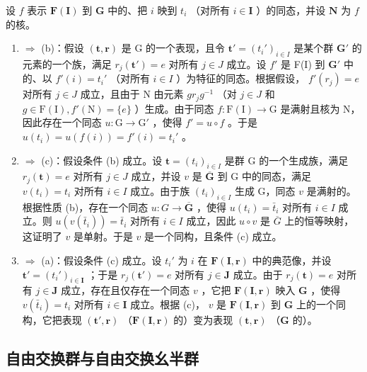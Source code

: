 设 \(f\) 表示 \(\mathbf{F}(\mathbf{I})\) 到 \(\mathbf{G}\) 中的、把 \(i\) 映到 \(t_i\) （对所有 \(i \in \mathbf{I}\) ）的同态，并设 \(\mathbf{N}\) 为 \(f\) 的核。

\begin{enumerate}
\def\labelenumi{(\alph{enumi})}
\item
  \(\Rightarrow\) (b)：假设 \((\mathbf{t},\mathbf{r})\) 是 G 的一个表现，且令 \(\mathbf{t}' = (t_i')_{i\in I}\) 是某个群 \(\mathbf{G}'\) 的元素的一个族，满足 \(r_j(\mathbf{t}') = e\) 对所有 \(j\in J\) 成立。设 \(f'\) 是 F(I) 到 \(\mathbf{G}'\) 中的、以 \(f'(i) = t_i'\) （对所有 \(i\in I\) ）为特征的同态。根据假设， \(f'(r_j) = e\) 对所有 \(j\in J\) 成立，且由于 N 由元素 \(gr_jg^{-1}\) （对 \(j\in J\) 和 \(g\in \mathrm{F}(\mathrm{I}),f'(\mathrm{N}) = \{e\}\) ）生成。由于同态 \(f\colon \mathrm{F}(\mathrm{I})\to \mathrm{G}\) 是满射且核为 N，因此存在一个同态 \(u\colon \mathrm{G}\to \mathrm{G}'\) ，使得 \(f' = u\circ f\) 。于是 \(u(t_i) = u(f(i)) = f'(i) = t_i'\) 。
\item
  \(\Rightarrow\) (c)：假设条件 (b) 成立。设 \(\mathbf{t} = (t_i)_{i\in I}\) 是群 G 的一个生成族，满足 \(r_j(\mathbf{t}) = e\) 对所有 \(j\in J\) 成立，并设 \(v\) 是 \(\overline{\mathbf{G}}\) 到 G 中的同态，满足 \(v(t_i) = t_i\) 对所有 \(i\in I\) 成立。由于族 \((t_i)_{i\in I}\) 生成 G，同态 \(v\) 是满射的。根据性质 (b)，存在一个同态 \(u\colon G\to \overline{\mathbf{G}}\) ，使得 \(u(t_i) = \bar{t}_i\) 对所有 \(i\in I\) 成立。则 \(u(v(\bar{t}_i)) = \bar{t}_i\) 对所有 \(i\in I\) 成立，因此 \(u \circ v\) 是 \(\overline{G}\) 上的恒等映射，这证明了 \(v\) 是单射。于是 \(v\) 是一个同构，且条件 (c) 成立。
\item
  \(\Rightarrow\) (a)：假设条件 (c) 成立。设 \(t_i'\) 为 \(i\) 在 \(\mathbf{F}(\mathbf{I},\mathbf{r})\) 中的典范像，并设 \(\mathbf{t}' = (t_i')_{i\in \mathbf{I}}\) ；于是 \(r_j(\mathbf{t}') = e\) 对所有 \(j\in \mathbf{J}\) 成立。由于 \(r_j(\mathbf{t}) = e\) 对所有 \(j\in \mathbf{J}\) 成立，存在且仅存在一个同态 \(v\) ，它把 \(\mathbf{F}(\mathbf{I},\mathbf{r})\) 映入 \(\mathbf{G}\) ，使得 \(v(\bar{t}_i) = t_i\) 对所有 \(i\in \mathbf{I}\) 成立。根据 (c)， \(v\) 是 \(\mathbf{F}(\mathbf{I},\mathbf{r})\) 到 \(\mathbf{G}\) 上的一个同构，它把表现 \((\mathbf{t}',\mathbf{r})\) （\(\mathbf{F}(\mathbf{I},\mathbf{r})\) 的）变为表现 \((\mathbf{t},\mathbf{r})\) （\(\mathbf{G}\) 的）。
\end{enumerate}

\subsection{自由交换群与自由交换幺半群}

